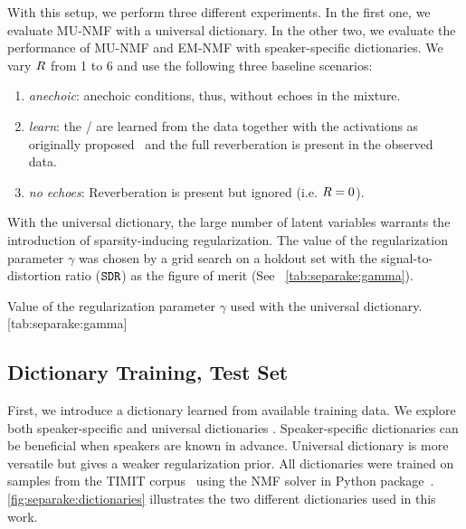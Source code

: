 \mynewline
With this setup, we perform three different experiments.
In the first one, we evaluate \ac{MU}-\ac{NMF} with a universal dictionary.
In the other two, we evaluate the performance of \ac{MU}-\ac{NMF} and \ac{EM}-\ac{NMF} with speaker-specific dictionaries.
We vary $R$ from 1 to 6 and use the following three baseline scenarios:
\begin{enumerate}
\item \textit{anechoic}: anechoic conditions, thus, without echoes in the mixture.
\item \textit{learn}: the \RTFs/ are learned from the data together with the activations as originally proposed~ and the full reverberation is present in the observed data.
\item \textit{no echoes}: Reverberation is present but ignored (i.e. $R=0$).
\end{enumerate}
With the universal dictionary, the large number of latent variables warrants the introduction of sparsity-inducing regularization.
The value of the regularization parameter $\gamma$ was chosen by a grid search on a holdout set with the signal-to-distortion ratio ($\mathtt{SDR}$) as the figure of merit  (See ~\cref{tab:separake:gamma}).

\begin{table}
    \begin{sidecaption}[]{
        Value of the regularization parameter $\gamma$ used with the universal dictionary.
        }[tab:separake:gamma]
        \centering
        \small
        
    \end{sidecaption}
\end{table}


\subsection{Dictionary Training, Test Set}\label{subsec:separake:dictionary}
First, we introduce a dictionary learned from available training data.
We explore both speaker-specific and universal dictionaries .
Speaker-specific dictionaries can be beneficial when speakers are known in advance.
Universal dictionary is more versatile but gives a weaker regularization prior.
All dictionaries were trained on samples from the TIMIT corpus~ using the \ac{NMF} solver in  Python package~.
\cref{fig:separake:dictionaries} illustrates the two different dictionaries used in this work.

